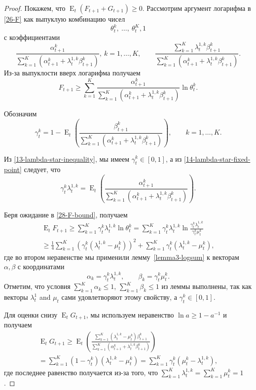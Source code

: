 \documentclass[a4paper,12pt,russian]{article} %
\theoremstyle{definition}
\DeclareMathOperator{\E}{E}
\begin{document}
\begin{proof}
Покажем, что $\E_{t}(F_{t+1} + G_{t+1}) \ge 0$.
Рассмотрим аргумент логарифма в \eqref{26-F} как выпуклую комбинацию чисел
\[
\theta_{t}^k,\ \ldots ,\ \theta_{t}^K, 1
\]
с коэффициентами
\[
\frac{\alpha_{t+1}^k}
     {\sum_{k=1}^K(\alpha_{t+1}^k + \lambda_{t}^{1,k}\beta_{t+1}^k)},
       \ k=1,\dots,K, \qquad
\frac{\sum_{k=1}^K \lambda_{t}^{1,k}\beta_{t+1}^k}
     {\sum_{k=1}^K(\alpha_{t+1}^k + \lambda_{t}^{1,k}\beta_{t+1}^k)}.
\]
Из-за выпуклости вверх логарифма получаем
\begin{equation}
\label{28-F-bound}
F_{t+1} 
\ge \sum_{k=1}^K
  \frac{\alpha_{t+1}^k}
       {\sum_{k=1}^K (\alpha_{t+1}^k + \lambda_{t}^{1,k} \beta_{t+1}^k)}
  \ln \theta_{t}^k.
\end{equation}

Обозначим
\begin{equation}
\gamma_{t}^k 
= 1 
  - \E_t \left( 
    \frac{\beta_{t+1}^k}
         {\sum_{k=1}^K (\alpha_{t+1}^k + \lambda_{t}^{1,k} \beta_{t+1}^k)}
  \right),
  \qquad k=1,\dots,K.
\label{29-gamma-t-k}
\end{equation}


Из \eqref{13-lambda-star-inequality}, мы имеем $\gamma_{t}^k\in [0,1]$, а из \eqref{14-lambda-star-fixed-point} следует, что 
\begin{equation}
\label{gt-lambda}
\gamma_{t}^k \lambda_{t}^{1,k} 
= \E_t \left(
  \frac{\alpha_{t+1}^k}
       {\sum_{k=1}^K(\alpha_{t+1}^k + \lambda_{t}^{1,k} \beta_{t+1}^k)}
  \right).
\end{equation}

Беря ожидание в \eqref{28-F-bound}, получаем
\begin{multline}
\label{31-EF-bound}
\E_t F_{t+1} 
\ge \sum_{k=1}^K \gamma_{t}^k \lambda_{t}^{1,k} \ln \theta_{t}^k 
= \sum_{k=1}^K \gamma_{t}^k \lambda_{t}^{1,k} 
  \ln\frac{\gamma_{t}^k\lambda_{t}^{1,k}}{\gamma_{t}^k\mu_{t}^k} \\
\ge \frac 14\sum_{k=1}^K (\gamma_{t}^k(\lambda_{t}^{1,k} - \mu_{t}^k))^2 
  + \sum_{k=1}^K \gamma_{t}^k(\lambda_{t}^{1,k} - \mu_{t}^k),
\end{multline}
где во втором неравенстве мы применили лемму~\ref{lemma3-logsum} к векторам $\alpha,\beta$ с координатами
\[
\alpha_k = \gamma_{t}^k\lambda_{t}^{1,k}, \qquad \beta_k = \gamma_{t}^k\mu_{t}^k.
\]
Отметим, что условия $\sum_{k=1}^K \alpha_k \le 1$, $\sum_{k=1}^K \beta_k \le 1$ из леммы выполнены, так как векторы $\lambda_t^1$ and $\mu_t$ сами удовлетворяют этому свойству, а $\gamma_{t}^k \in [0,1]$.

Для оценки снизу $\E_t G_{t+1}$, мы используем неравенство $\ln a \ge 1 - a^{-1}$ и получаем
\begin{multline}
\label{32-EG-bound}
\E_t G_{t+1} 
\ge \E_t \left( 
  \frac{\sum_{k=1}^K (\lambda_{t}^{1,k} - \mu_{t}^k) \beta_{t+1}^k}
       {\sum_{k=1}^K (\alpha_{t+1}^k + \lambda_{t}^{1,k} \beta_{t+1}^k)}
  \right) \\
= \sum_{k=1}^K (1-\gamma_{t}^k) (\lambda_{t}^{1,k} - \mu_{t}^k) 
= \sum_{k=1}^K \gamma_{t}^k (\mu_{t}^k - \lambda_{t}^{1,k}),
\end{multline}
где последнее равенство получается из-за того, что $\sum_{k=1}^K \lambda_{t}^{1,k} = \sum_{k=1}^K \mu_{t}^k = 1$. 


\end{proof}
\end{document}
